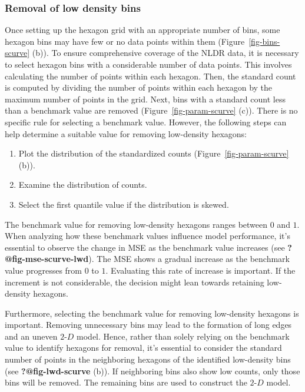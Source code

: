 \documentclass[
  12pt]{article}
\providecommand{\tightlist}{%
  \setlength{\itemsep}{0pt}\setlength{\parskip}{0pt}}\usepackage{longtable,booktabs,array}
\def\tightlist{}
\newcommand\gD{$2\text{-}D$}
\begin{document}
\subsubsection{Removal of low density
bins}\label{removal-of-low-density-bins}

Once setting up the hexagon grid with an appropriate number of bins,
some hexagon bins may have few or no data points within them
(Figure~\ref{fig-bins-scurve} (b)). To ensure comprehensive coverage of
the NLDR data, it is necessary to select hexagon bins with a
considerable number of data points. This involves calculating the number
of points within each hexagon. Then, the standard count is computed by
dividing the number of points within each hexagon by the maximum number
of points in the grid. Next, bins with a standard count less than a
benchmark value are removed (Figure~\ref{fig-param-scurve} (c)). There
is no specific rule for selecting a benchmark value. However, the
following steps can help determine a suitable value for removing
low-density hexagons:

\begin{enumerate}
\def\labelenumi{\arabic{enumi}.}
\tightlist
\item
  Plot the distribution of the standardized counts
  (Figure~\ref{fig-param-scurve} (b)).
\item
  Examine the distribution of counts.
\item
  Select the first quantile value if the distribution is skewed.
\end{enumerate}

The benchmark value for removing low-density hexagons ranges between
\(0\) and \(1\). When analyzing how these benchmark values influence
model performance, it's essential to observe the change in MSE as the
benchmark value increases (see \textbf{?@fig-mse-scurve-lwd}). The MSE
shows a gradual increase as the benchmark value progresses from \(0\) to
\(1\). Evaluating this rate of increase is important. If the increment
is not considerable, the decision might lean towards retaining
low-density hexagons.

Furthermore, selecting the benchmark value for removing low-density
hexagons is important. Removing unnecessary bins may lead to the
formation of long edges and an uneven \gD{} model. Hence, rather than
solely relying on the benchmark value to identify hexagons for removal,
it's essential to consider the standard number of points in the
neighboring hexagons of the identified low-density bins (see
\textbf{?@fig-lwd-scurve} (b)). If neighboring bins also show low
counts, only those bins will be removed. The remaining bins are used to
construct the \gD{} model.
\end{document}
